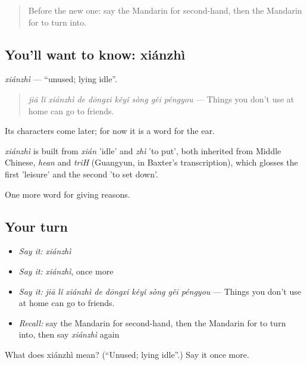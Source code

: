 \label{lesson:ZH-C386-xianzhi}



\begin{quote}
Before the new one: say the Mandarin for second-hand, then the Mandarin for to turn into.
\end{quote}

\subsection*{You'll want to know: xiánzhì}
\emph{xiánzhì} — \textquotedblleft{}unused; lying idle\textquotedblright{}.

\begin{quote}
\emph{jiā lǐ xiánzhì de dōngxi kěyǐ sòng gěi péngyou} — Things you don't use at home can go to friends.
\end{quote}

Its characters come later; for now it is a word for the ear.

\begin{cousinweb}
\emph{xiánzhì} is built from \emph{xián} 'idle' and \emph{zhì} 'to put', both inherited from Middle Chinese, \emph{hean} and \emph{triH} (Guangyun, in Baxter's transcription), which glosses the first 'leisure' and the second 'to set down'.
\end{cousinweb}

\begin{grammarlens}[title={What you've built}]
One more word for giving reasons.
\end{grammarlens}

\subsection*{Your turn}
\begin{itemize}
\raggedright
  \item \emph{Say it:} \emph{xiánzhì}
  \item \emph{Say it:} \emph{xiánzhì}, once more
  \item \emph{Say it:} \emph{jiā lǐ xiánzhì de dōngxi kěyǐ sòng gěi péngyou} — Things you don't use at home can go to friends.
  \item \emph{Recall:} say the Mandarin for second-hand, then the Mandarin for to turn into, then say \emph{xiánzhì} again
\end{itemize}

\begin{tcolorbox}[breakable,colback=teal!4,colframe=teal!35!black,title={Before you move on}]
What does xiánzhì mean? (\textquotedblleft{}Unused; lying idle\textquotedblright{}.) Say it once more.
\end{tcolorbox}
